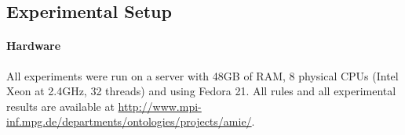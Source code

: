 

\subsection{Experimental Setup}\label{setup}

\paragraph{Hardware}
All experiments were run on a server with 48GB of RAM, 8 physical CPUs (Intel Xeon at 2.4GHz, 32 threads) and using Fedora 21.
All rules and all experimental results are available at \url{http://www.mpi-inf.mpg.de/departments/ontologies/projects/amie/}.

